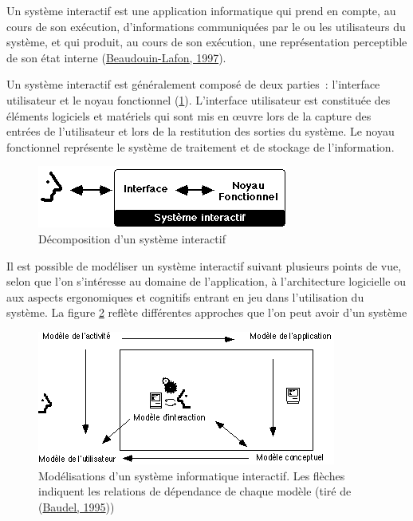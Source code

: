 \documentclass[
]{book}
\begin{document}
Un système interactif est une application informatique qui prend en
compte, au cours de son exécution, d'informations communiquées par le ou les
utilisateurs du système, et qui produit, au cours de son exécution, une
représentation perceptible de son état interne (\protect\hyperlink{ref-beaudouin1997ingenierie}{Beaudouin-Lafon, 1997}).

Un système interactif est généralement composé de deux parties~:
l'interface utilisateur et le noyau fonctionnel
(\ref{fig:decompositiondunsysteme}). L'interface utilisateur est
constituée des éléments logiciels et matériels qui sont mis en œuvre lors de
la capture des entrées de l'utilisateur et lors de la restitution des sorties
du système. Le noyau fonctionnel représente le système de traitement et de
stockage de l'information.

\begin{figure}
\centering
\includegraphics{img/sys_inter.png}
\caption{\label{fig:decompositiondunsysteme} Décomposition d'un système
interactif}
\end{figure}

Il est possible de modéliser un système interactif suivant plusieurs
points de vue, selon que l'on s'intéresse au domaine de l'application, à
l'architecture logicielle ou aux aspects ergonomiques et cognitifs entrant en
jeu dans l'utilisation du système. La figure \ref{fig:modelisationsdunsysteme}
reflète différentes approches que l'on peut avoir d'un système

\begin{figure}
\centering
\includegraphics{img/I21.png}
\caption{\label{fig:modelisationsdunsysteme}Modélisations d'un système
informatique interactif. Les flèches indiquent les relations de
dépendance de chaque modèle (tiré de (\protect\hyperlink{ref-baudel1995aspects}{Baudel, 1995}))}
\end{figure}
\end{document}
